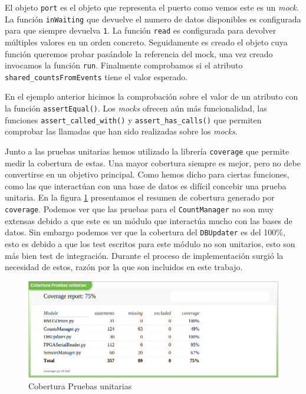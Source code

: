 	El objeto \texttt{port} es el objeto que representa el puerto como vemos este es un \emph{mock}. La función \texttt{inWaiting} que devuelve el
	numero de datos disponibles es configurada para que siempre devuelva \texttt{1}. La función \texttt{read} es configurada para devolver
	múltiples valores en un orden concreto. Seguidamente es creado el objeto cuya función queremos probar pasándole la referencia del mock, una
	vez creado invocamos la función \texttt{run}. Finalmente comprobamos si el atributo \texttt{shared\_countsFromEvents} tiene el valor esperado.
	\par
	En el ejemplo anterior hicimos la comprobación sobre el valor de un atributo con la función \texttt{assertEqual()}. Los \emph{mocks} ofrecen
	aún más funcionalidad, las funciones \texttt{assert\_called\_with()} y \texttt{assert\_has\_calls()} que permiten comprobar las llamadas que
	han sido realizadas sobre los \emph{mocks}.
	\par
	Junto a las pruebas unitarias hemos utilizado la librería \texttt{coverage} que permite medir la cobertura de estas. Una mayor cobertura
	siempre es mejor, pero no debe convertirse en un objetivo principal. Como hemos dicho para ciertas funciones, como las que interactúan con una
	base de datos es difícil concebir una prueba unitaria. En la figura \ref{fig:coverage} presentamos el resumen de cobertura generado por
	\texttt{coverage}.  Podemos ver que las pruebas para el \texttt{CountManager} no son muy extensas debido a que este es un módulo que
	interactúa mucho con las bases de datos. Sin embargo podemos ver que la cobertura del \texttt{DBUpdater} es del 100\%, esto es debido a que
	los test escritos para este módulo no son unitarios, esto son más bien test de integración. Durante el proceso de implementación surgió la
	necesidad de estos, razón por la que son incluidos en este trabajo.
	\begin{figure}[h]
		\centering
		\includegraphics[keepaspectratio, width=1\textwidth]{./img/coverage.png}
		\caption{Cobertura Pruebas unitarias}   
		\label{fig:coverage}
	\end{figure}

